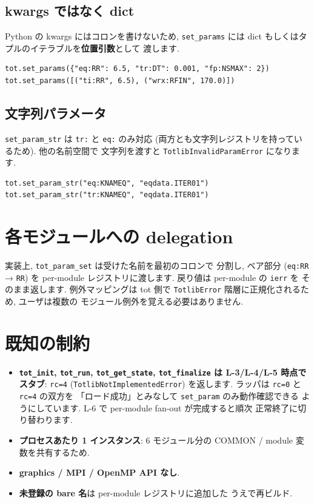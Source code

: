 \documentclass[11pt,a4paper]{report}
\begin{document}
\subsection{kwargs ではなく dict}

Python の kwargs にはコロンを書けないため, \texttt{set\_params}
には dict もしくはタプルのイテラブルを\textbf{位置引数}として
渡します.

\begin{lstlisting}[style=py]
tot.set_params({"eq:RR": 6.5, "tr:DT": 0.001, "fp:NSMAX": 2})
tot.set_params([("ti:RR", 6.5), ("wrx:RFIN", 170.0)])
\end{lstlisting}

\subsection{文字列パラメータ}

\texttt{set\_param\_str} は \texttt{tr:} と \texttt{eq:} のみ対応
(両方とも文字列レジストリを持っているため). 他の名前空間で
文字列を渡すと \texttt{TotlibInvalidParamError} になります.

\begin{lstlisting}[style=py]
tot.set_param_str("eq:KNAMEQ", "eqdata.ITER01")
tot.set_param_str("tr:KNAMEQ", "eqdata.ITER01")
\end{lstlisting}

\section{各モジュールへの delegation}

実装上, \texttt{tot\_param\_set} は受けた名前を最初のコロンで
分割し, ベア部分 (\texttt{eq:RR} → \texttt{RR}) を per-module
レジストリに渡します. 戻り値は per-module の \texttt{ierr} を
そのまま返します. 例外マッピングは tot 側で
\texttt{TotlibError} 階層に正規化されるため, ユーザは複数の
モジュール例外を覚える必要はありません.

\section{既知の制約}

\begin{itemize}[leftmargin=1.5em]
  \item \textbf{\texttt{tot\_init}, \texttt{tot\_run},
        \texttt{tot\_get\_state}, \texttt{tot\_finalize} は L-3/L-4/L-5
        時点でスタブ}: \texttt{rc=4} (\texttt{TotlibNotImplementedError})
        を返します. ラッパは \texttt{rc=0} と \texttt{rc=4} の双方を
        「ロード成功」とみなして \texttt{set\_param} のみ動作確認できる
        ようにしています. L-6 で per-module fan-out が完成すると順次
        正常終了に切り替わります.
  \item \textbf{プロセスあたり 1 インスタンス}: 6 モジュール分の
        COMMON / module 変数を共有するため.
  \item \textbf{graphics / MPI / OpenMP API なし}.
  \item \textbf{未登録の bare 名}は per-module レジストリに追加した
        うえで再ビルド.
\end{itemize}
\end{document}
